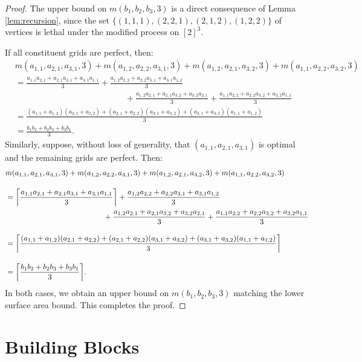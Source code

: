 \begin{proof}
The upper bound on $m(b_1, b_2, b_3, 3)$ is a direct consequence of Lemma \ref{lem:recursion}, since the set $\{(1,1,1), (2,2,1), (2,1,2), (1,2,2)\}$ of vertices is lethal under the modified process on $[2]^3$. 

If all constituent grids are perfect, then:  
\begin{align*}
&m(a_{1,1}, a_{2,1}, a_{3,1}, 3) +  m(a_{1,2}, a_{2,2}, a_{3,1}, 3) + m(a_{1,2}, a_{2,1}, a_{3,2}, 3) + m(a_{1,1}, a_{2,2}, a_{3,2}, 3) \\[10pt]
&= \frac{a_{1,1}a_{2,1} + a_{2,1}a_{3,1} + a_{3,1}a_{1,1}}{3} + \frac{a_{1,2}a_{2,2} + a_{2,2}a_{3,1} + a_{3,1}a_{1,2}}{3} \\
&\qquad\qquad\qquad\qquad\qquad\qquad\quad + \frac{a_{1,2}a_{2,1} + a_{2,1}a_{3,2} + a_{3,2}a_{2,1}}{3} + \frac{a_{1,1}a_{2,2} + a_{2,2}a_{3,2} + a_{3,2}a_{1,1}}{3} \\[10pt]
&= \frac{(a_{1,1} + a_{1,2})(a_{2,1} + a_{2,2}) + (a_{2,1} + a_{2,2})(a_{3,1} + a_{3,2}) + (a_{3,1} + a_{3,2})(a_{1,1} + a_{1,2})}{3} \\[10pt]
&= \frac{b_1b_2+b_2b_3+b_3b_1}{3}.
\end{align*}
Similarly, suppose, without loss of generality, that $(a_{1,1}, a_{2,1}, a_{3,1})$ is optimal and the remaining grids are perfect. Then:
\begin{align*}
&m(a_{1,1}, a_{2,1}, a_{3,1}, 3) +  m(a_{1,2}, a_{2,2}, a_{3,1}, 3) + m(a_{1,2}, a_{2,1}, a_{3,2}, 3) + m(a_{1,1}, a_{2,2}, a_{3,2}, 3) \\[10pt]
&= \ceil*{\frac{a_{1,1}a_{2,1} + a_{2,1}a_{3,1} + a_{3,1}a_{1,1}}{3}} + \frac{a_{1,2}a_{2,2} + a_{2,2}a_{3,1} + a_{3,1}a_{1,2}}{3} \\
&\qquad\qquad\qquad\qquad\qquad\qquad\quad + \frac{a_{1,2}a_{2,1} + a_{2,1}a_{3,2} + a_{3,2}a_{2,1}}{3} + \frac{a_{1,1}a_{2,2} + a_{2,2}a_{3,2} + a_{3,2}a_{1,1}}{3} \\[10pt]
&= \ceil*{\frac{(a_{1,1} + a_{1,2})(a_{2,1} + a_{2,2}) + (a_{2,1} + a_{2,2})(a_{3,1} + a_{3,2}) + (a_{3,1} + a_{3,2})(a_{1,1} + a_{1,2})}{3}} \\[10pt]
&= \ceil*{\frac{b_1b_2+b_2b_3+b_3b_1}{3}}.
\end{align*}
In both cases, we obtain an upper bound on $m(b_1, b_2, b_3, 3)$ matching the lower surface area bound. This completes the proof. 
\end{proof}

\section{Building Blocks}

